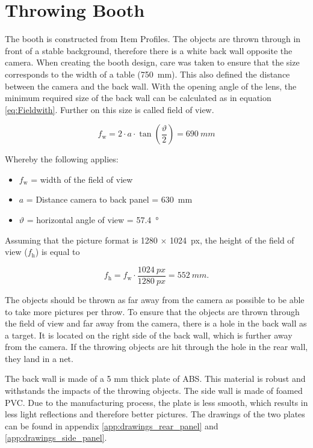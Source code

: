 \section{Throwing Booth}
\label{sec:booth}
The booth is constructed from Item Profiles.
The objects are thrown through in front of a stable background, therefore there is a white back wall opposite the camera.
When creating the booth design, care was taken to ensure that the size corresponds to the width of a table (\SI{750}{mm}).
This also defined the distance between the camera and the back wall.
With the opening angle of the lens, the minimum required size of the back wall can be calculated as in equation \ref{eq:Fieldwith}. 
Further on this size is called field of view.

\begin{equation}
	f_\text{w} = 2 \cdot a \cdot \tan\left( \frac{\vartheta}{2}\right) = \SI{690}{mm}
	\label{eq:Fieldwith}
\end{equation}

Whereby the following applies:
\begin{itemize}
	\item $f_\text{w}$ = width of the field of view
	\item $a$ = Distance camera to back panel = \SI{630}{mm}
	\item $\vartheta$ = horizontal angle of view = \SI{57.4}{\degree} \cite{baumer_lense}
\end{itemize}

Assuming that the picture format is 1280 $\times$ \SI{1024}{px}, the height of the field of view ($f_\text{h}$) is equal to

\begin{equation}
	f_\text{h} = f_\text{w} \cdot \frac{\SI{1024}{px}}{\SI{1280}{px}} = \SI{552}{mm}.
	\label{eq:Fieldhight}
\end{equation}

The objects should be thrown as far away from the camera as possible to be able to take more pictures per throw.
To ensure that the objects are thrown through the field of view and far away from the camera, there is a hole in the back wall as a target.
It is located on the right side of the back wall, which is further away from the camera.
If the throwing objects are hit through the hole in the rear wall, they land in a net.

The back wall is made of a 5 mm thick plate of ABS.
This material is robust and withstands the impacts of the throwing objects.
The side wall is made of foamed PVC.
Due to the manufacturing process, the plate is less smooth, which results in less light reflections and therefore better pictures.
The drawings of the two plates can be found in appendix \ref{app:drawings_rear_panel} and \ref{app:drawings_side_panel}.

